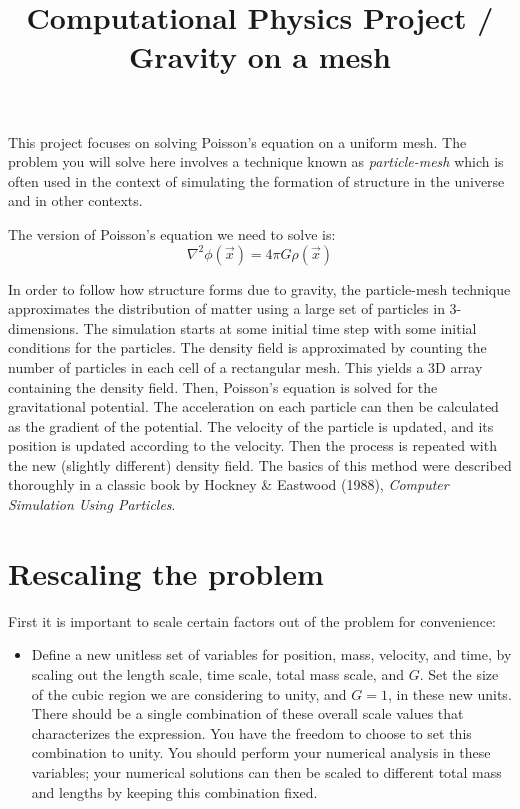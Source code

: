 \documentclass[11pt, preprint]{aastex}
\begin{document}
\title{\bf Computational Physics Project / Gravity on a mesh}

This project focuses on solving Poisson's equation on a uniform mesh.
The problem you will solve here involves a technique known as {\it
  particle-mesh} which is often used in the context of simulating the
formation of structure in the universe and in other contexts.

The version of Poisson's equation we need to solve is:
\begin{equation}
\nabla^2 \phi(\vec{x}) = 4\pi G \rho(\vec{x})
\end{equation}

In order to follow how structure forms due to gravity, the
particle-mesh technique approximates the distribution of matter using
a large set of particles in 3-dimensions. The simulation starts at
some initial time step with some initial conditions for the
particles. The density field is approximated by counting the number of
particles in each cell of a rectangular mesh. This yields a 3D array
containing the density field. Then, Poisson's equation is solved for
the gravitational potential. The acceleration on each particle can
then be calculated as the gradient of the potential. The velocity of
the particle is updated, and its position is updated according to the
velocity. Then the process is repeated with the new (slightly
different) density field. The basics of this method were described
thoroughly in a classic book by Hockney \& Eastwood (1988), {\it
  Computer Simulation Using Particles}.

\section{Rescaling the problem}

First it is important to scale certain factors out of the problem for
convenience: 
\begin{itemize}
\item Define a new unitless set of variables for position, mass,
  velocity, and time, by scaling out the length scale, time scale,
  total mass scale, and $G$. Set the size of the cubic region we are
  considering to unity, and $G=1$, in these new units. There should be
  a single combination of these overall scale values that
  characterizes the expression. You have the freedom to choose to set
  this combination to unity. You should perform your numerical
  analysis in these variables; your numerical solutions can then be
  scaled to different total mass and lengths by keeping this
  combination fixed.
\end{itemize}
\end{document}

